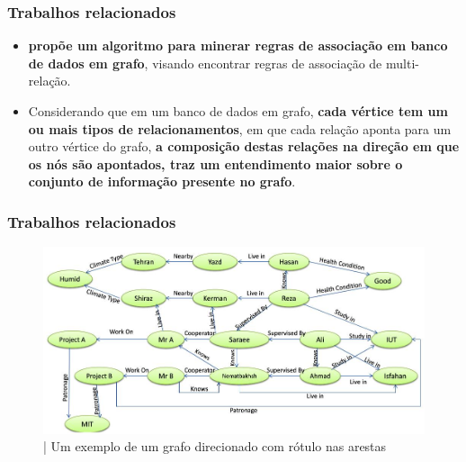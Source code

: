 \documentclass[hyperref={pdfpagelabels=false}]{beamer}
\begin{document}
\begin{frame}
	\frametitle{Trabalhos relacionados}
\begin{itemize}
	\item \cite{Ramezani2014} \textbf{propõe um algoritmo para minerar regras de associação em banco de dados em grafo}, visando encontrar regras de associação de multi-relação. 
    \item Considerando que em um banco de dados em grafo, \textbf{cada vértice tem um ou mais tipos de relacionamentos}, em que cada relação aponta para um outro vértice do grafo, \textbf{a composição destas relações na direção em que os nós são apontados, traz um entendimento maior sobre o conjunto de informação presente no grafo}.
	\end{itemize}		
\end{frame}

\begin{frame}
\frametitle{Trabalhos relacionados}
\begin{figure}[h]
	\centering
		\includegraphics[scale=0.3]{img/Graph}
	\caption{| Um exemplo de um grafo direcionado com rótulo nas arestas \cite{Ramezani2014}}
	\label{fig:Graph}
\end{figure}
\end{frame}



\end{document}
